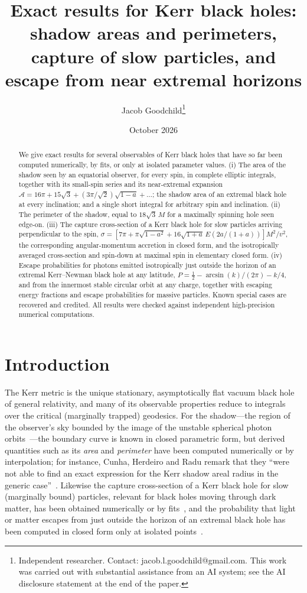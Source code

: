 \documentclass[11pt,a4paper]{article}
\title{Exact results for Kerr black holes: shadow areas and perimeters, capture of slow particles, and escape from near extremal horizons}
\author{Jacob Goodchild\thanks{Independent researcher. Contact: jacob.l.goodchild@gmail.com.
This work was carried out with substantial assistance from an AI system; see the
AI disclosure statement at the end of the paper.}}
\date{October 2026}
\theoremstyle{remark}
\numberwithin{equation}{section}
\begin{document}
\maketitle

\begin{abstract}
We give exact results for several observables of Kerr black holes that have so far been computed
numerically, by fits, or only at isolated parameter values. (i) The area of the shadow seen by an equatorial
observer, for every spin, in complete elliptic integrals, together with its small-spin series and its
near-extremal expansion $\mathcal A=16\pi+15\sqrt3+(3\pi/\sqrt2)\sqrt{1-a}+\dots$; the shadow area of an
extremal black hole at every inclination; and a single short integral for arbitrary spin and inclination.
(ii) The perimeter of the shadow, equal to $18\sqrt3\,M$ for a maximally spinning hole seen edge-on.
(iii) The capture cross-section of a Kerr black hole for slow particles arriving perpendicular to the spin,
$\sigma=[7\pi+\pi\sqrt{1-a^2}+16\sqrt{1+a}\,E(2a/(1+a))]M^2/v^2$, the corresponding angular-momentum accretion in closed form,
and the isotropically averaged cross-section and spin-down at maximal spin in elementary closed form.
(iv) Escape probabilities for photons emitted isotropically just outside the horizon of an extremal
Kerr--Newman black hole at any latitude, $P=\tfrac12-\arcsin(k)/(2\pi)-k/4$, and from the innermost stable circular
orbit at any charge, together with escaping energy fractions and escape probabilities for massive particles.
Known special cases are recovered and credited. All results were checked against independent high-precision
numerical computations.
\end{abstract}


\section{Introduction}

The Kerr metric is the unique stationary, asymptotically flat vacuum black hole of general relativity,
and many of its observable properties reduce to integrals over the critical (marginally trapped)
geodesics. For the shadow---the region of the observer's sky bounded by the image of the unstable
spherical photon orbits~\cite{Bardeen1973,Chandrasekhar1983}---the boundary curve is known in closed
parametric form, but derived quantities such as its \emph{area} and \emph{perimeter} have been computed
numerically or by interpolation; for instance, Cunha, Herdeiro and Radu remark that they ``were not able to
find an exact expression for the Kerr shadow areal radius in the generic case''~\cite{CunhaHerdeiroRadu2019}.
Likewise the capture cross-section of a Kerr black hole for slow (marginally bound) particles, relevant for
black holes moving through dark matter, has been obtained numerically or by fits~\cite{Young1976,Will2012,Karydas2026,MachMomenniaSarbach2026}, and the
probability that light or matter escapes from just outside the horizon of an extremal black hole has been
computed in closed form only at isolated points~\cite{YanGuoChen2021,GatesHadarLupsasca2021}.
\end{document}
